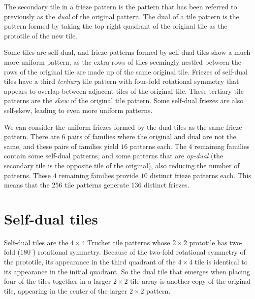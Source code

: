 \documentclass{tufte-book}
\begin{document}
\vspace{0.5cm}
\noindent
The secondary tile in a frieze pattern is the pattern that has been referred to previously as the \textit{dual} of the original pattern. The dual of a tile pattern is the pattern formed by taking the top right quadrant of the original tile as the prototile of the new tile.

\vspace{0.5cm}
\noindent
Some tiles are self-dual, and frieze patterns formed by self-dual tiles show a much more uniform pattern, as the extra rows of tiles seemingly nestled between the rows of the original tile are made up of the same original tile. Friezes of self-dual tiles have a third \textit{tertiary} tile pattern with four-fold rotational symmetry that appears to overlap between adjacent tiles of the original tile. These tertiary tile patterns are the \textit{skew} of the original tile pattern. Some self-dual friezes are also self-skew, leading to even more uniform patterns.

\vspace{0.5cm}
\noindent
We can consider the uniform friezes formed by the dual tiles as the same frieze pattern. There are $6$ pairs of families where the original and dual are not the same, and these pairs of families yield $16$ patterns each. The $4$ remaining families contain some self-dual patterns, and some patterns that are \textit{op-dual} (the secondary tile is the opposite tile of the original), also reducing the number of patterns. These $4$ remaining families provide $10$ distinct frieze patterns each. This means that the $256$ tile patterns generate $136$ distinct friezes. 

\vspace{0.5cm}
\noindent

\noindent
\newpage



\chapter{Self-dual tiles}

\noindent
Self-dual tiles are the $4\times 4$ Truchet tile patterns whose $2\times 2$ prototile has two-fold ($180^{\circ}$) rotational symmetry. Because of the two-fold rotational symmetry of the prototile, its appearance in the third quadrant of the $4\times 4$ tile is identical to its appearance in the initial quadrant. So the dual tile that emerges when placing four of the tiles together in a larger $2\times 2$ tile array is another copy of the original tile, appearing in the center of the  larger $2\times 2$ pattern. 
\end{document}
